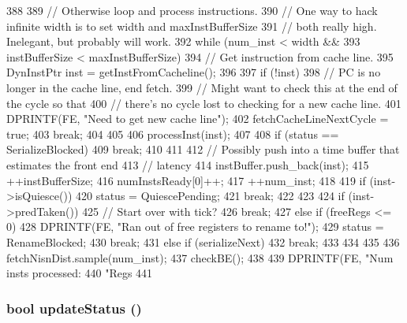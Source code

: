 \begin{DoxyCode}
{388 
389     // Otherwise loop and process instructions.
390     // One way to hack infinite width is to set width and maxInstBufferSize
391     // both really high.  Inelegant, but probably will work.
392     while (num_inst < width &&
393            instBufferSize < maxInstBufferSize) {
394         // Get instruction from cache line.
395         DynInstPtr inst = getInstFromCacheline();
396 
397         if (!inst) {
398             // PC is no longer in the cache line, end fetch.
399             // Might want to check this at the end of the cycle so that
400             // there's no cycle lost to checking for a new cache line.
401             DPRINTF(FE, "Need to get new cache line\n");
402             fetchCacheLineNextCycle = true;
403             break;
404         }
405 
406         processInst(inst);
407 
408         if (status == SerializeBlocked) {
409             break;
410         }
411 
412         // Possibly push into a time buffer that estimates the front end
413         // latency
414         instBuffer.push_back(inst);
415         ++instBufferSize;
416         numInstsReady[0]++;
417         ++num_inst;
418 
419         if (inst->isQuiesce()) {
420             status = QuiescePending;
421             break;
422         }
423 
424         if (inst->predTaken()) {
425             // Start over with tick?
426             break;
427         } else if (freeRegs <= 0) {
428             DPRINTF(FE, "Ran out of free registers to rename to!\n");
429             status = RenameBlocked;
430             break;
431         } else if (serializeNext) {
432             break;
433         }
434     }
435 
436     fetchNisnDist.sample(num_inst);
437     checkBE();
438 
439     DPRINTF(FE, "Num insts processed: %
440             "Regs %
441 }
\end{DoxyCode}
\hypertarget{classFrontEnd_a9a8ca871f405a4b52efc2a2f9f38a69a}{
\subsubsection[{updateStatus}]{\setlength{\rightskip}{0pt plus 5cm}bool updateStatus ()}}
\label{classFrontEnd_a9a8ca871f405a4b52efc2a2f9f38a69a}



